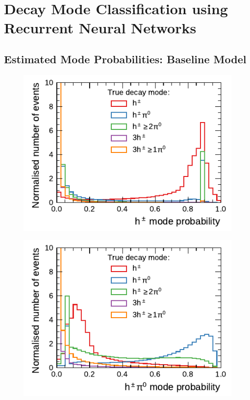 \clearpage
\section{Decay Mode Classification using Recurrent Neural Networks}
\label{app:decay_mode}

\subsection{Estimated Mode Probabilities: Baseline Model}
\label{app:baseline_probabilities}

\noindent
\begin{minipage}{\textwidth}
  \captionsetup{type=figure}
  \begin{subfigure}{0.48\textwidth}
    \centering
    \includegraphics{./figures/decay_mode_classification/mode_proba_baseline_ptcut_1_5/proba_1p0n.pdf}
  \end{subfigure}\hfill
  \begin{subfigure}{0.48\textwidth}
    \centering
    \includegraphics{./figures/decay_mode_classification/mode_proba_baseline_ptcut_1_5/proba_1p1n.pdf}

\end{subfigure}
\end{minipage}
